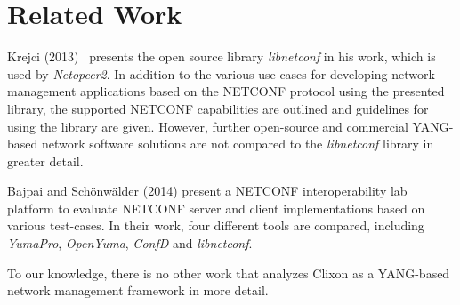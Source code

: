 \section{Related Work}
\label{sec:related-work}

Krejci (2013)~\cite{libnetconf-krejci} presents the open source library \textit{libnetconf} in his work, which is used by \textit{Netopeer2}. In addition to the various use cases for developing network management applications based on the NETCONF protocol using the presented library, the supported NETCONF capabilities are outlined and guidelines for using the library are given. However, further open-source and commercial YANG-based network software solutions are not compared to the \textit{libnetconf} library in greater detail.


Bajpai and Schönwälder (2014) \cite{netconf-interop-lab} present a NETCONF interoperability lab platform to evaluate NETCONF server and client implementations based on various test-cases. In their work, four different tools are compared, including \textit{YumaPro}, \textit{OpenYuma}, \textit{ConfD} and \textit{libnetconf}.

To our knowledge, there is no other work that analyzes Clixon as a YANG-based network management framework in more detail.


